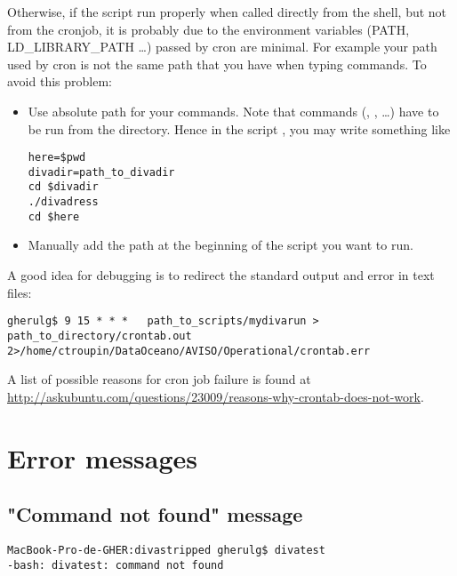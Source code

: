Otherwise, if the script run properly when called directly from the shell, but not from the cronjob, it is probably due to the environment variables (PATH, LD\_LIBRARY\_PATH \ldots) passed by cron are minimal. For example your path used by cron is not the same path that you have when typing commands. To avoid this problem:
\begin{itemize}
\item Use absolute path for your commands. Note that \diva commands (, , \ldots) have to be run from the  directory. Hence in the script , you may write something like
\begin{lstlisting}[style=Bash]
here=$pwd
divadir=path_to_divadir
cd $divadir
./divadress
cd $here
\end{lstlisting}
\item Manually add the path at the beginning of the script you want to run.
\end{itemize}

A good idea for debugging is to redirect the standard output and error in text files:
\begin{lstlisting}[style=Bash]
gherulg$ 9 15 * * *   path_to_scripts/mydivarun > path_to_directory/crontab.out 2>/home/ctroupin/DataOceano/AVISO/Operational/crontab.err
\end{lstlisting}

A list of possible reasons for cron job failure is found at\\
\url{http://askubuntu.com/questions/23009/reasons-why-crontab-does-not-work}.


\section{Error messages}



\subsection{"Command not found" message}

\begin{lstlisting}[style=Bash]
MacBook-Pro-de-GHER:divastripped gherulg$ divatest
-bash: divatest: command not found
\end{lstlisting}


